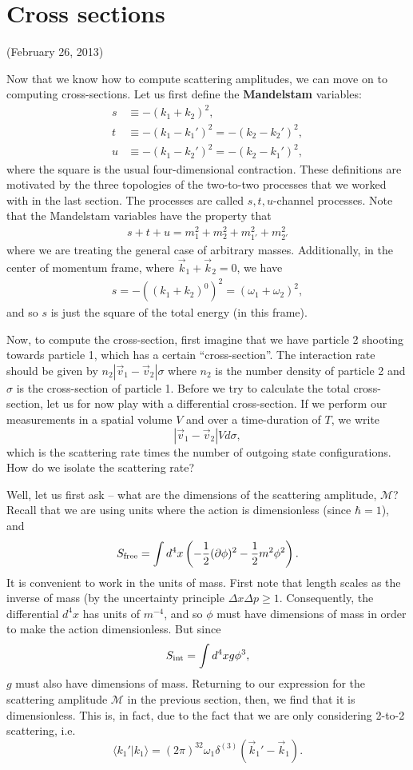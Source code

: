 \documentclass{../mathnotes}
\begin{document}
\section*{Cross sections}

(February 26, 2013)

Now that we know how to compute scattering amplitudes, we can move on to computing cross-sections.
Let us first define the \textbf{Mandelstam} variables:
\begin{align*}
    s&\equiv -(k_1+k_2)^2,\\
    t&\equiv -(k_1-k_1')^2=-(k_2-k_2')^2,\\
    u&\equiv -(k_1-k_2')^2=-(k_2-k_1')^2,
\end{align*}
where the square is the usual four-dimensional contraction. These definitions are motivated by the three topologies of the
two-to-two processes that we worked with in the last section. The processes are called $s,t,u$-channel processes. Note that
the Mandelstam variables have the property that
\begin{align*}
    s+t+u=m_1^2+m_2^2+m_{1'}^2+m_{2'}^2
\end{align*}
where we are treating the general case of arbitrary masses. Additionally, in the center of momentum frame, where $\vec{k}_1+\vec{k}_2=0$,
we have
\begin{align*}
    s=-\left( (k_1+k_2)^0 \right)^2=(\omega_1+\omega_2)^2,
\end{align*}
and so $s$ is just the square of the total energy (in this frame).

Now, to compute the cross-section, first imagine that we have particle 2 shooting towards particle 1, which has a certain ``cross-section''.
The interaction rate should be given by $n_2|\vec{v}_1-\vec{v}_2|\sigma$ where $n_2$ is the number density of particle 2 and $\sigma$ is
the cross-section of particle 1. Before we try to calculate the total cross-section, let us for now play with a differential cross-section.
If we perform our measurements in a spatial volume $V$ and over a time-duration of $T$, we write
\[{|\vec{v}_1-\vec{v}_2|}{V}d\sigma,\]
which is the scattering rate times the number of outgoing state configurations. How do we isolate the scattering rate?

Well, let us first ask -- what are the dimensions of the scattering amplitude, $\mathcal{M}$? Recall that we are using units where
the action is dimensionless (since $\hbar=1$), and
\[S_{\rm free}=\int d^4x \left( -\frac{1}{2}(\partial\phi)^2-\frac{1}{2}m^2\phi^2 \right).\]
It is convenient to work in the units of mass. First note that length scales as the inverse of mass (by the uncertainty principle
$\Delta x\Delta p \geq 1$. Consequently, the differential $d^4x$ has units of $m^{-4}$, and so $\phi$ must have dimensions of mass
in order to make the action dimensionless. But since
\[S_{\rm int}=\int d^4x g\phi^3,\]
$g$ must also have dimensions of mass. Returning to our expression for the scattering amplitude $\mathcal{M}$ in the previous section, then, we find
that it is dimensionless. This is, in fact, due to the fact that we are only considering 2-to-2 scattering, i.e.
\[\langle k_1'|k_1\rangle = (2\pi)^32\omega_1\delta^{(3)}(\vec{k}_1'-\vec{k}_1).\]
\end{document}
